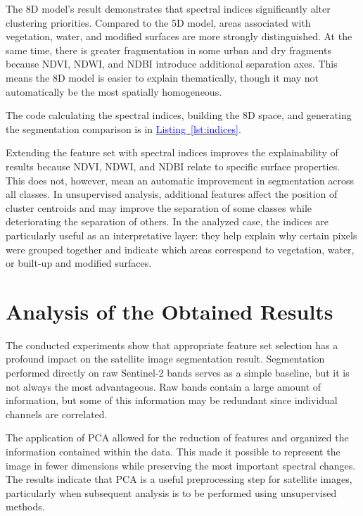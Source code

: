 \documentclass[12pt,a4paper]{article}
\newcommand{\kodref}[2]{\hyperref[#1]{\textcolor{blue}{#2}}}
\begin{document}
    The 8D model's result demonstrates that spectral indices significantly alter clustering priorities. Compared to the 5D model, areas associated with vegetation, water, and modified surfaces are more strongly distinguished. At the same time, there is greater fragmentation in some urban and dry fragments because NDVI, NDWI, and NDBI introduce additional separation axes. This means the 8D model is easier to explain thematically, though it may not automatically be the most spatially homogeneous.

    The code calculating the spectral indices, building the 8D space, and generating the segmentation comparison is in \kodref{lst:indices}{Listing~\ref*{lst:indices}}.

    Extending the feature set with spectral indices improves the explainability of results because NDVI, NDWI, and NDBI relate to specific surface properties. This does not, however, mean an automatic improvement in segmentation across all classes. In unsupervised analysis, additional features affect the position of cluster centroids and may improve the separation of some classes while deteriorating the separation of others. In the analyzed case, the indices are particularly useful as an interpretative layer: they help explain why certain pixels were grouped together and indicate which areas correspond to vegetation, water, or built-up and modified surfaces.

\section{Analysis of the Obtained Results}
\label{sec:analiza-wynikow}

    The conducted experiments show that appropriate feature set selection has a profound impact on the satellite image segmentation result. Segmentation performed directly on raw Sentinel-2 bands serves as a simple baseline, but it is not always the most advantageous. Raw bands contain a large amount of information, but some of this information may be redundant since individual channels are correlated.

    The application of PCA allowed for the reduction of features and organized the information contained within the data. This made it possible to represent the image in fewer dimensions while preserving the most important spectral changes. The results indicate that PCA is a useful preprocessing step for satellite images, particularly when subsequent analysis is to be performed using unsupervised methods.
\end{document}
